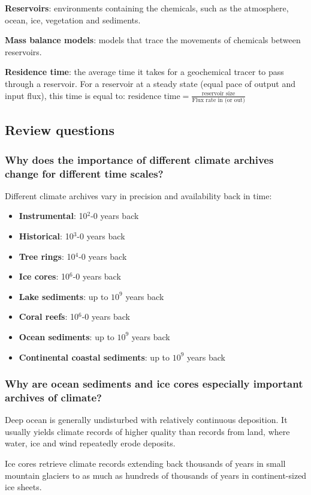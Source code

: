 \textbf{Reservoirs}: environments containing the chemicals, such as the
atmosphere, ocean, ice, vegetation and sediments.

\textbf{Mass balance models}: models that trace the movements of chemicals
between reservoirs.

\textbf{Residence time}: the average time it takes for a geochemical tracer to
pass through a reservoir. For a reservoir at a steady state (equal pace of
output and input flux), this time is equal to:
$\text{residence time} = \frac{\text{reservoir size}}{\text{Flux rate in
(or out)}}$

\subsection{Review questions}

\subsubsection{Why does the importance of different climate archives change
for different time scales?}
Different climate archives vary in precision and availability back in time:
\begin{itemize}
	\item \textbf{Instrumental}: 10$^2$-0 years back
	\item \textbf{Historical}: 10$^3$-0 years back
	\item \textbf{Tree rings}: 10$^4$-0 years back
	\item \textbf{Ice cores}: 10$^6$-0 years back
	\item \textbf{Lake sediments}: up to $10^9$ years back
	\item \textbf{Coral reefs}: 10$^6$-0 years back
	\item \textbf{Ocean sediments}: up to $10^9$ years back
	\item \textbf{Continental coastal sediments}: up to $10^9$ years back
\end{itemize}

\subsubsection{Why are ocean sediments and ice cores especially important
archives of climate?}
Deep ocean is generally undisturbed with relatively continuous deposition.
It usually yields climate records of higher quality than records from land,
where water, ice and wind repeatedly erode deposits.

Ice cores retrieve climate records extending back thousands of years in small
mountain glaciers to as much as hundreds of thousands of years in
continent-sized ice sheets.

